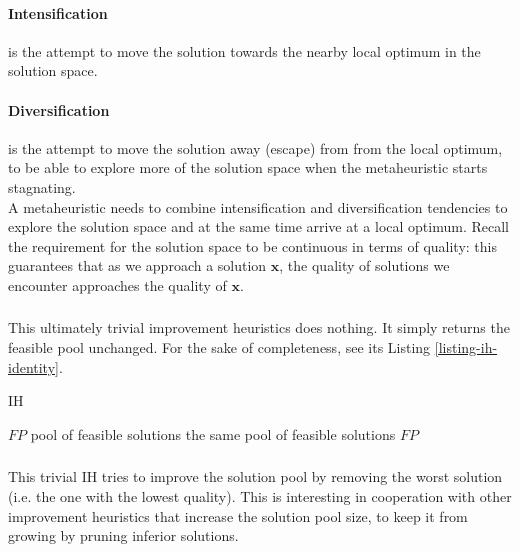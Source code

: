 \paragraph{Intensification}

is the attempt to move the solution towards the nearby local optimum in the solution space.

\paragraph{Diversification}

is the attempt to move the solution away (escape) from from the local optimum, to be able to explore more of the solution space when the metaheuristic starts stagnating.\\

A metaheuristic needs to combine intensification and diversification tendencies to explore the solution space and at the same time arrive at a local optimum. Recall the requirement for the solution space to be continuous in terms of quality: this guarantees that as we approach a solution $\mathbf{x}$, the quality of solutions we encounter approaches the quality of $\mathbf{x}$.

\subsubsection{}

This ultimately trivial improvement heuristics does nothing. It simply returns the feasible pool unchanged. For the sake of completeness, see its Listing \ref{listing-ih-identity}.

\begin{algorithm}
\caption{ IH}
\label{listing-ih-identity}
\begin{algorithmic}
\REQUIRE $FP$ pool of feasible solutions
\ENSURE the same pool of feasible solutions
\RETURN $FP$
\end{algorithmic}
\end{algorithm}

\subsubsection{}

This trivial IH tries to improve the solution pool by removing the worst solution (i.e. the one with the lowest quality). This is interesting in cooperation with other improvement heuristics that increase the solution pool size, to keep it from growing by pruning inferior solutions.

